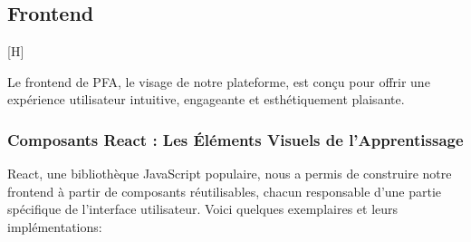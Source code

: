 \subsection{Frontend}[H]

Le frontend de PFA, le visage de notre plateforme, est conçu pour offrir une expérience utilisateur intuitive, engageante et esthétiquement plaisante.

\subsubsection{Composants React : Les Éléments Visuels de l'Apprentissage}

React, une bibliothèque JavaScript populaire, nous a permis de construire notre frontend à partir de composants réutilisables, chacun responsable d'une partie spécifique de l'interface utilisateur. Voici quelques exemplaires et leurs implémentations:

